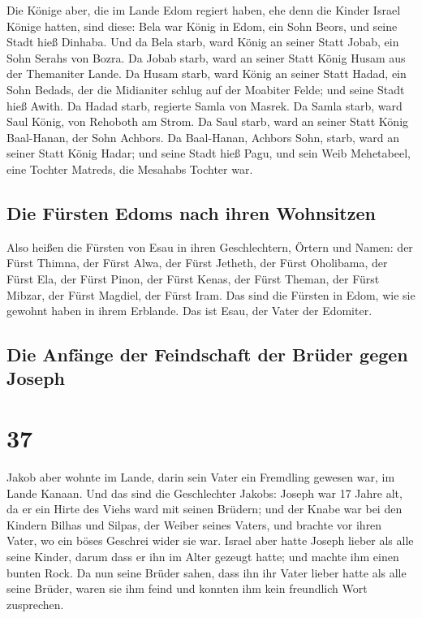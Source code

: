  Die Könige aber, die im Lande Edom regiert haben, ehe
denn die Kinder Israel Könige hatten, sind diese:  Bela
war König in Edom, ein Sohn Beors, und seine Stadt hieß Dinhaba.
 Und da Bela starb, ward König an seiner Statt Jobab, ein
Sohn Serahs von Bozra.  Da Jobab starb, ward an seiner
Statt König Husam aus der Themaniter Lande.  Da Husam
starb, ward König an seiner Statt Hadad, ein Sohn Bedads, der die
Midianiter schlug auf der Moabiter Felde; und seine Stadt hieß Awith.
 Da Hadad starb, regierte Samla von Masrek.
 Da Samla starb, ward Saul König, von Rehoboth am Strom.
 Da Saul starb, ward an seiner Statt König Baal-Hanan,
der Sohn Achbors.  Da Baal-Hanan, Achbors Sohn, starb,
ward an seiner Statt König Hadar; und seine Stadt hieß Pagu, und sein
Weib Mehetabeel, eine Tochter Matreds, die Mesahabs Tochter war.

\hypertarget{die-fuxfcrsten-edoms-nach-ihren-wohnsitzen}{%
\subsection{Die Fürsten Edoms nach ihren
Wohnsitzen}\label{die-fuxfcrsten-edoms-nach-ihren-wohnsitzen}}

 Also heißen die Fürsten von Esau in ihren Geschlechtern,
Örtern und Namen: der Fürst Thimna, der Fürst Alwa, der Fürst Jetheth,
 der Fürst Oholibama, der Fürst Ela, der Fürst Pinon,
 der Fürst Kenas, der Fürst Theman, der Fürst Mibzar,
 der Fürst Magdiel, der Fürst Iram. Das sind die Fürsten
in Edom, wie sie gewohnt haben in ihrem Erblande. Das ist Esau, der
Vater der Edomiter.

\hypertarget{die-anfuxe4nge-der-feindschaft-der-bruxfcder-gegen-joseph}{%
\subsection{Die Anfänge der Feindschaft der Brüder gegen
Joseph}\label{die-anfuxe4nge-der-feindschaft-der-bruxfcder-gegen-joseph}}

\hypertarget{section-36}{%
\section{37}\label{section-36}}

 Jakob aber wohnte im Lande, darin sein Vater ein
Fremdling gewesen war, im Lande Kanaan.  Und das sind die
Geschlechter Jakobs: Joseph war 17 Jahre alt, da er ein Hirte des Viehs
ward mit seinen Brüdern; und der Knabe war bei den Kindern Bilhas und
Silpas, der Weiber seines Vaters, und brachte vor ihren Vater, wo ein
böses Geschrei wider sie war.  Israel aber hatte Joseph
lieber als alle seine Kinder, darum dass er ihn im Alter gezeugt hatte;
und machte ihm einen bunten Rock.  Da nun seine Brüder
sahen, dass ihn ihr Vater lieber hatte als alle seine Brüder, waren sie
ihm feind und konnten ihm kein freundlich Wort zusprechen.

